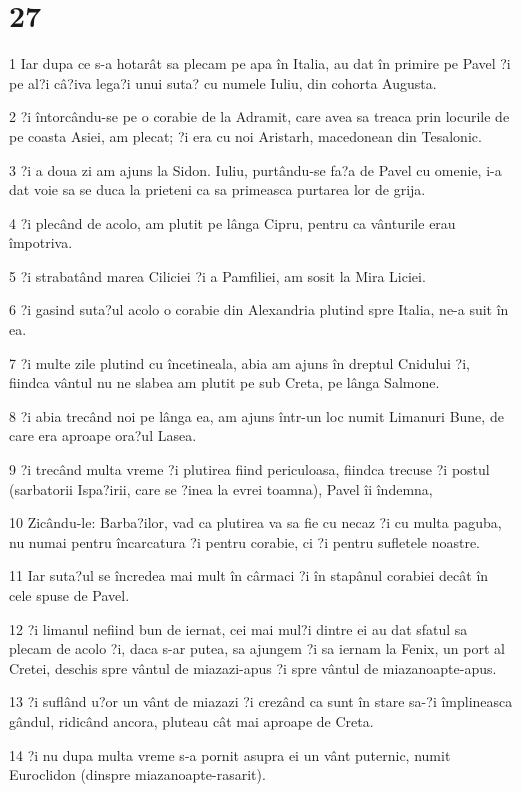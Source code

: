 \chapter{27}

\par 1 Iar dupa ce s-a hotarât sa plecam pe apa în Italia, au dat în primire pe Pavel ?i pe al?i câ?iva lega?i unui suta? cu numele Iuliu, din cohorta Augusta.
\par 2 ?i întorcându-se pe o corabie de la Adramit, care avea sa treaca prin locurile de pe coasta Asiei, am plecat; ?i era cu noi Aristarh, macedonean din Tesalonic.
\par 3 ?i a doua zi am ajuns la Sidon. Iuliu, purtându-se fa?a de Pavel cu omenie, i-a dat voie sa se duca la prieteni ca sa primeasca purtarea lor de grija.
\par 4 ?i plecând de acolo, am plutit pe lânga Cipru, pentru ca vânturile erau împotriva.
\par 5 ?i strabatând marea Ciliciei ?i a Pamfiliei, am sosit la Mira Liciei.
\par 6 ?i gasind suta?ul acolo o corabie din Alexandria plutind spre Italia, ne-a suit în ea.
\par 7 ?i multe zile plutind cu încetineala, abia am ajuns în dreptul Cnidului ?i, fiindca vântul nu ne slabea am plutit pe sub Creta, pe lânga Salmone.
\par 8 ?i abia trecând noi pe lânga ea, am ajuns într-un loc numit Limanuri Bune, de care era aproape ora?ul Lasea.
\par 9 ?i trecând multa vreme ?i plutirea fiind periculoasa, fiindca trecuse ?i postul (sarbatorii Ispa?irii, care se ?inea la evrei toamna), Pavel îi îndemna,
\par 10 Zicându-le: Barba?ilor, vad ca plutirea va sa fie cu necaz ?i cu multa paguba, nu numai pentru încarcatura ?i pentru corabie, ci ?i pentru sufletele noastre.
\par 11 Iar suta?ul se încredea mai mult în cârmaci ?i în stapânul corabiei decât în cele spuse de Pavel.
\par 12 ?i limanul nefiind bun de iernat, cei mai mul?i dintre ei au dat sfatul sa plecam de acolo ?i, daca s-ar putea, sa ajungem ?i sa iernam la Fenix, un port al Cretei, deschis spre vântul de miazazi-apus ?i spre vântul de miazanoapte-apus.
\par 13 ?i suflând u?or un vânt de miazazi ?i crezând ca sunt în stare sa-?i împlineasca gândul, ridicând ancora, pluteau cât mai aproape de Creta.
\par 14 ?i nu dupa multa vreme s-a pornit asupra ei un vânt puternic, numit Euroclidon (dinspre miazanoapte-rasarit).
